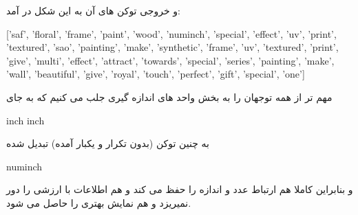 \documentclass[a4paper,12pt]{article}
\begin{document}
و خروجی توکن های آن به این شکل در آمد:
\begin{latin}
	['saf', 'floral', 'frame', 'paint', 'wood', 'numinch', 'special', 'effect', 'uv', 'print', 'textured', 'sao', 'painting', 'make', 'synthetic', 'frame', 'uv', 'textured', 'print', 'give', 'multi', 'effect', 'attract', 'towards', 'special', 'series', 'painting', 'make', 'wall', 'beautiful', 'give', 'royal', 'touch', 'perfect', 'gift', 'special', 'one']
\end{latin}

مهم تر از همه توجهان را به بخش واحد های اندازه گیری جلب می کنیم که به جای 
\begin{latin}
	inch inch 
\end{latin}
به چنین توکن (بدون تکرار و یکبار آمده) تبدیل شده
\begin{latin}
	numinch
\end{latin}
و بنابراین کاملا هم ارتباط عدد و اندازه را حفظ می کند و هم اطلاعات با ارزشی را دور نمیریزد و هم نمایش بهتری را حاصل می شود.
\end{document}
